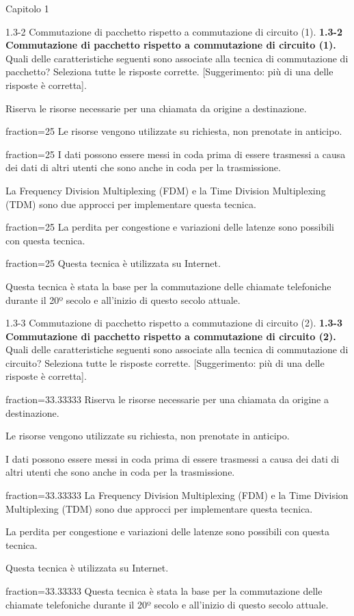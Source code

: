 \documentclass[a4paper]{article}
\begin{document}
\begin{quiz}{Capitolo 1}
\begin{multi}[points=1,shuffle=true,multiple]{1.3-2 Commutazione di pacchetto rispetto a commutazione di circuito (1).}
\textbf{1.3-2 Commutazione di pacchetto rispetto a commutazione di circuito (1).}
Quali delle caratteristiche seguenti sono associate alla tecnica di commutazione di pacchetto? Seleziona tutte le risposte corrette. [Suggerimento: più di una delle risposte è corretta].
\item Riserva le risorse necessarie per una chiamata da origine a destinazione.
\item[fraction=25] Le risorse vengono utilizzate su richiesta, non prenotate in anticipo.
\item[fraction=25] I dati possono essere messi in coda prima di essere trasmessi a causa dei dati di altri utenti che sono anche in coda per la trasmissione.
\item La Frequency Division Multiplexing (FDM) e la Time Division Multiplexing (TDM) sono due approcci per implementare questa tecnica.
\item[fraction=25] La perdita per congestione e variazioni delle latenze sono possibili con questa tecnica.
\item[fraction=25] Questa tecnica è utilizzata su Internet.
\item Questa tecnica è stata la base per la commutazione delle chiamate telefoniche durante il 20º secolo e all'inizio di questo secolo attuale.
\end{multi}

\begin{multi}[points=1,shuffle=true,multiple]{1.3-3 Commutazione di pacchetto rispetto a commutazione di circuito (2).}
\textbf{1.3-3 Commutazione di pacchetto rispetto a commutazione di circuito (2).}
Quali delle caratteristiche seguenti sono associate alla tecnica di commutazione di circuito? Seleziona tutte le risposte corrette. [Suggerimento: più di una delle risposte è corretta].
\item[fraction=33.33333] Riserva le risorse necessarie per una chiamata da origine a destinazione.
\item Le risorse vengono utilizzate su richiesta, non prenotate in anticipo.
\item I dati possono essere messi in coda prima di essere trasmessi a causa dei dati di altri utenti che sono anche in coda per la trasmissione.
\item[fraction=33.33333] La Frequency Division Multiplexing (FDM) e la Time Division Multiplexing (TDM) sono due approcci per implementare questa tecnica.
\item La perdita per congestione e variazioni delle latenze sono possibili con questa tecnica.
\item Questa tecnica è utilizzata su Internet.
\item[fraction=33.33333] Questa tecnica è stata la base per la commutazione delle chiamate telefoniche durante il 20º secolo e all'inizio di questo secolo attuale.
\end{multi}


\end{quiz}
\end{document}
